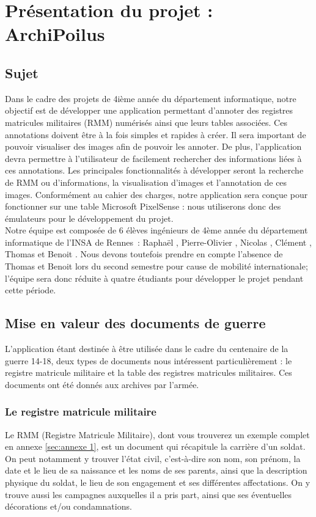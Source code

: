 \documentclass[a4paper]{article}
\begin{document}
\newpage

\section{Présentation du projet : ArchiPoilus}

\subsection{Sujet}

	Dans le cadre des projets de 4ième année du département informatique, notre objectif est de développer une application permettant d’annoter des registres matricules militaires (RMM) numérisés ainsi que leurs tables associées. Ces annotations doivent être à la fois simples et rapides à créer. Il sera important de pouvoir visualiser des images afin de pouvoir les annoter. De plus, l’application devra permettre à l’utilisateur de facilement rechercher des informations liées à ces annotations. Les principales fonctionnalités à développer seront la recherche de RMM ou d’informations, la visualisation d’images et l’annotation de ces images. Conformément au cahier des charges, notre application sera conçue pour fonctionner sur une table Microsoft PixelSense : nous utiliserons donc des émulateurs pour le développement du projet.\\
	
	Notre équipe est composée de 6 élèves ingénieurs de 4ème année du département informatique de l’INSA de Rennes : Raphaël , Pierre-Olivier , Nicolas , Clément , Thomas  et Benoit . Nous devons toutefois prendre en compte l’absence de Thomas et Benoit lors du second semestre pour cause de mobilité internationale; l’équipe sera donc réduite à quatre étudiants pour développer le projet pendant cette période.

\subsection{Mise en valeur des documents de guerre}

	L'application étant destinée à être utilisée dans le cadre du centenaire de la guerre 14-18, deux types de documents nous intéressent particulièrement : le registre matricule militaire et la table des registres matricules militaires. Ces documents ont été donnés aux archives par l'armée.

\subsubsection{Le registre matricule militaire}
	Le RMM (Registre Matricule Militaire), dont vous trouverez un exemple complet en annexe \ref{sec:annexe 1}, est un document qui récapitule la carrière d'un soldat. On peut notamment y trouver l'état civil, c'est-à-dire son nom, son prénom, la date et le lieu de sa naissance et les noms de ses parents, ainsi que la description physique du soldat, le lieu de son engagement et ses différentes affectations. On y trouve aussi les campagnes auxquelles il a pris part, ainsi que ses éventuelles décorations et/ou condamnations.\\
\end{document}
